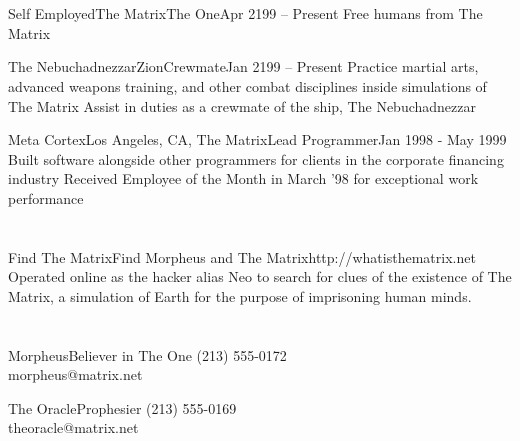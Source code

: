 \documentclass{resume}
\begin{document}

\section*{}

\begin{job}{Self Employed}{The Matrix}{The One}{Apr 2199 -- Present}
	\bullet Free humans from The Matrix
\end{job}

\begin{job}{The Nebuchadnezzar}{Zion}{Crewmate}{Jan 2199 -- Present}
	\bullet Practice martial arts, advanced weapons training, and other combat
		disciplines inside simulations of The Matrix
	\bullet Assist in duties as a crewmate of the ship, The Nebuchadnezzar
\end{job}

\begin{job}{Meta Cortex}{Los Angeles, CA, The Matrix}{Lead Programmer}{Jan 1998 - May 1999}
	\bullet Built software alongside other programmers for clients in the
		corporate financing industry
	\bullet Received Employee of the Month in March '98 for exceptional work
		performance
\end{job}

\section*{}

\begin{project}{Find The Matrix}{Find Morpheus and The Matrix}{http://whatisthematrix.net}
	Operated online as the hacker alias Neo to search for clues of the
	existence of The Matrix, a simulation of Earth for the purpose of
	imprisoning human minds.
\end{project}


\section*{}

\begin{reference}{Morpheus}{Believer in The One}
	(213) 555-0172\\
	morpheus@matrix.net
\end{reference}

\begin{reference}{The Oracle}{Prophesier}
	(213) 555-0169\\
	theoracle@matrix.net
\end{reference}
\end{document}
